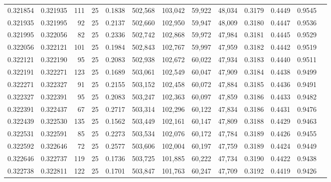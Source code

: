\begin{tabular}{rrrrrrrrrrrrr}
0.321854 & 0.321935 &   111 &  25 &                                     0.1838 & 502,568 & 103,042 &  59,922 &  48,034 & 0.3179 & 0.4449 & 0.9545 \\
0.321935 & 0.321995 &    92 &  25 &                                     0.2137 & 502,660 & 102,950 &  59,947 &  48,009 & 0.3180 & 0.4447 & 0.9536 \\
0.321995 & 0.322056 &    82 &  25 &                                     0.2336 & 502,742 & 102,868 &  59,972 &  47,984 & 0.3181 & 0.4445 & 0.9529 \\
0.322056 & 0.322121 &   101 &  25 &                                     0.1984 & 502,843 & 102,767 &  59,997 &  47,959 & 0.3182 & 0.4442 & 0.9519 \\
0.322121 & 0.322190 &    95 &  25 &                                     0.2083 & 502,938 & 102,672 &  60,022 &  47,934 & 0.3183 & 0.4440 & 0.9511 \\
0.322191 & 0.322271 &   123 &  25 &                                     0.1689 & 503,061 & 102,549 &  60,047 &  47,909 & 0.3184 & 0.4438 & 0.9499 \\
0.322271 & 0.322327 &    91 &  25 &                                     0.2155 & 503,152 & 102,458 &  60,072 &  47,884 & 0.3185 & 0.4436 & 0.9491 \\
0.322327 & 0.322391 &    95 &  25 &                                     0.2083 & 503,247 & 102,363 &  60,097 &  47,859 & 0.3186 & 0.4433 & 0.9482 \\
0.322391 & 0.322437 &    67 &  25 &                                     0.2717 & 503,314 & 102,296 &  60,122 &  47,834 & 0.3186 & 0.4431 & 0.9476 \\
0.322439 & 0.322530 &   135 &  25 &                                     0.1562 & 503,449 & 102,161 &  60,147 &  47,809 & 0.3188 & 0.4429 & 0.9463 \\
0.322531 & 0.322591 &    85 &  25 &                                     0.2273 & 503,534 & 102,076 &  60,172 &  47,784 & 0.3189 & 0.4426 & 0.9455 \\
0.322592 & 0.322646 &    72 &  25 &                                     0.2577 & 503,606 & 102,004 &  60,197 &  47,759 & 0.3189 & 0.4424 & 0.9449 \\
0.322646 & 0.322737 &   119 &  25 &                                     0.1736 & 503,725 & 101,885 &  60,222 &  47,734 & 0.3190 & 0.4422 & 0.9438 \\
0.322738 & 0.322811 &   122 &  25 &                                     0.1701 & 503,847 & 101,763 &  60,247 &  47,709 & 0.3192 & 0.4419 & 0.9426 \\

\end{tabular}
